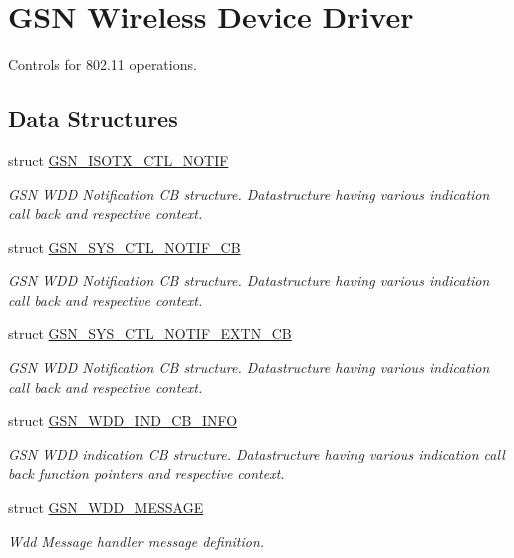 \hypertarget{a00677}{
\section{GSN Wireless Device Driver}
\label{a00677}
}


Controls for 802.11 operations.  


\subsection*{Data Structures}
\begin{DoxyCompactItemize}
\item 
struct \hyperlink{a00101}{GSN\_\-ISOTX\_\-CTL\_\-NOTIF}
\begin{DoxyCompactList}\small\item\em GSN WDD Notification CB structure. Datastructure having various indication call back and respective context. \end{DoxyCompactList}\item 
struct \hyperlink{a00253}{GSN\_\-SYS\_\-CTL\_\-NOTIF\_\-CB}
\begin{DoxyCompactList}\small\item\em GSN WDD Notification CB structure. Datastructure having various indication call back and respective context. \end{DoxyCompactList}\item 
struct \hyperlink{a00254}{GSN\_\-SYS\_\-CTL\_\-NOTIF\_\-EXTN\_\-CB}
\begin{DoxyCompactList}\small\item\em GSN WDD Notification CB structure. Datastructure having various indication call back and respective context. \end{DoxyCompactList}\item 
struct \hyperlink{a00275}{GSN\_\-WDD\_\-IND\_\-CB\_\-INFO}
\begin{DoxyCompactList}\small\item\em GSN WDD indication CB structure. Datastructure having various indication call back function pointers and respective context. \end{DoxyCompactList}\item 
struct \hyperlink{a00277}{GSN\_\-WDD\_\-MESSAGE}
\begin{DoxyCompactList}\small\item\em Wdd Message handler message definition. \end{DoxyCompactList}\item 

\end{DoxyCompactItemize}
